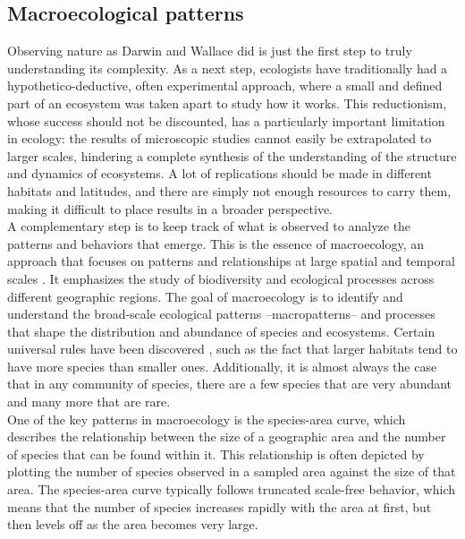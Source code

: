 \subsection{Macroecological patterns}\label{chp:methods:macro}
Observing nature as Darwin and Wallace did is just the first step to truly understanding its complexity. As a next step, ecologists have traditionally had a hypothetico-deductive, often experimental approach, where a small and defined part of an ecosystem was taken apart to study how it works. This reductionism, whose success should not be discounted, has a particularly important limitation in ecology:  the results of microscopic studies cannot easily be extrapolated to larger scales, hindering a complete synthesis of the understanding of the structure and dynamics of ecosystems. A lot of replications should be made in different habitats and latitudes, and there are simply not enough resources to carry them, making it difficult to place results in a broader perspective. \\

A complementary step is to keep track of what is observed to analyze the patterns and behaviors that emerge. This is the essence of macroecology, an approach that focuses on patterns and relationships at large spatial and temporal scales \cite{brown1995macroecology}. It emphasizes the study of biodiversity and ecological processes across different geographic regions. The goal of macroecology is to identify and understand the broad-scale ecological patterns –macropatterns– and processes that shape the distribution and abundance of species and ecosystems. Certain universal rules have been discovered \cite{verberk2011explaining}, such as the fact that larger habitats tend to have more species than smaller ones. Additionally, it is almost always the case that in any community of species, there are a few species that are very abundant and many more that are rare. \\

One of the key patterns in macroecology is the species-area curve, which describes the relationship between the size of a geographic area and the number of species that can be found within it. This relationship is often depicted by plotting the number of species observed in a sampled area against the size of that area. The species-area curve typically follows truncated scale-free behavior, which means that the number of species increases rapidly with the area at first, but then levels off as the area becomes very large. \\


